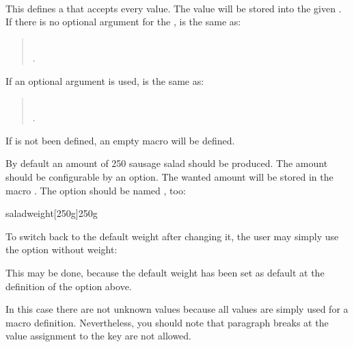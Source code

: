 \begin{Declaration}
                         \\
\end{Declaration}
%
This defines a  that accepts
every value. The value will be stored into the given . If there
is no optional argument for the ,  is
the same as:
\begin{quote}
%
\\
%
.
\end{quote}
If an optional argument  is used, 
is the same as:
\begin{quote}
%
\\
%
%
.
\end{quote}
If  is not been defined, an empty macro will be defined.
\begin{Example}
  By default an amount of 250 sausage salad should be produced. The
  amount should be configurable by an option. The wanted amount will be stored
  in the macro . The option should be named
  , too:
\begin{lstcode}
  \newcommand*{\saladweight}{250g}
                  {saladweight}[250g]{\saladweight}
\end{lstcode}
  To switch back to the default weight after changing it, the user may simply
  use the option without weight:
\begin{lstcode}
\end{lstcode}
  This may be done, because the default weight has been set as default at the
  definition of the option above.
\end{Example}
In this case there are not unknown values because all values are simply used
for a macro definition. Nevertheless, you should note that paragraph breaks
at the value assignment to the key are not allowed.
%
%



